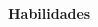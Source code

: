 \noindent\textbf{Habilidades}
\noindent\hrulefill
\vspace{0.25em}
\begin{adjustwidth}{1.5em}{0em}

\end{adjustwidth}
\vspace{0.25em}